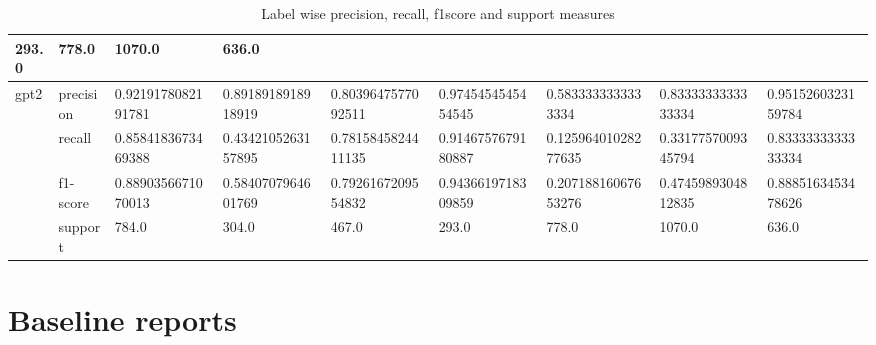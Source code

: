 \begin{landscape}
\begin{table}[]
{\begin{tabular}{@{}lllllllll@{}}
  \multicolumn{1}{l|}{293.0} &
  \multicolumn{1}{l|}{778.0} &
  \multicolumn{1}{l|}{1070.0} &
  \multicolumn{1}{l|}{636.0} \\ \midrule
\multicolumn{1}{|l|}{\multirow{4}{*}{gpt2}} &
  \multicolumn{1}{l|}{precision} &
  \multicolumn{1}{l|}{0.9219178082191781} &
  \multicolumn{1}{l|}{0.8918918918918919} &
  \multicolumn{1}{l|}{0.8039647577092511} &
  \multicolumn{1}{l|}{0.9745454545454545} &
  \multicolumn{1}{l|}{0.5833333333333334} &
  \multicolumn{1}{l|}{0.8333333333333334} &
  \multicolumn{1}{l|}{0.9515260323159784} \\ \cmidrule(l){2-9} 
\multicolumn{1}{|l|}{} &
  \multicolumn{1}{l|}{recall} &
  \multicolumn{1}{l|}{0.8584183673469388} &
  \multicolumn{1}{l|}{0.4342105263157895} &
  \multicolumn{1}{l|}{0.7815845824411135} &
  \multicolumn{1}{l|}{0.9146757679180887} &
  \multicolumn{1}{l|}{0.12596401028277635} &
  \multicolumn{1}{l|}{0.3317757009345794} &
  \multicolumn{1}{l|}{0.8333333333333334} \\ \cmidrule(l){2-9} 
\multicolumn{1}{|l|}{} &
  \multicolumn{1}{l|}{f1-score} &
  \multicolumn{1}{l|}{0.8890356671070013} &
  \multicolumn{1}{l|}{0.5840707964601769} &
  \multicolumn{1}{l|}{0.7926167209554832} &
  \multicolumn{1}{l|}{0.9436619718309859} &
  \multicolumn{1}{l|}{0.20718816067653276} &
  \multicolumn{1}{l|}{0.4745989304812835} &
  \multicolumn{1}{l|}{0.8885163453478626} \\ \cmidrule(l){2-9} 
\multicolumn{1}{|l|}{} &
  \multicolumn{1}{l|}{support} &
  \multicolumn{1}{l|}{784.0} &
  \multicolumn{1}{l|}{304.0} &
  \multicolumn{1}{l|}{467.0} &
  \multicolumn{1}{l|}{293.0} &
  \multicolumn{1}{l|}{778.0} &
  \multicolumn{1}{l|}{1070.0} &
  \multicolumn{1}{l|}{636.0} \\ \bottomrule
\end{tabular}%
}
\caption{Label wise precision, recall, f1score and support measures}
\label{tab:Per-Label-precision-recall-f-measure}
\end{table}
\end{landscape}

\section{Baseline reports}

